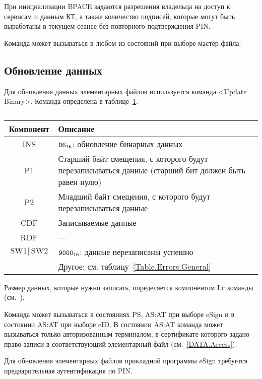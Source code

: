 При инициализации BPACE задаются разрешения 
владельца на доступ к сервисам и данным  
КТ, а также количество подписей, которые могут быть выработаны 
в текущем сеансе без повторного подтверждения PIN.

Команда может вызываться в любом из состояний при выборе мастер-файла.

\subsection{Обновление данных}
\label{Oper.Descr.Update}

Для обновления данных элементарных файлов используется команда <Update Binary>.
Команда определена в таблице~\ref{Table.Oper.UpdateCmd}.

\begin{table}[hbt]
\caption{}\label{Table.Oper.UpdateCmd}
\begin{tabular}{|c|p{14cm}|}
\hline
Компонент & Описание\\
\hline
\hline
INS & $\texttt{D6}_{16}$: обновление бинарных данных\\
\hline
P1 & Старший байт смещения, с которого будут перезаписываться данные 
(старший бит должен быть равен нулю) \\
\hline
P2 & Младший байт смещения, с которого будут перезаписываться данные \\
\hline
CDF & Записываемые данные \\
\hline 
RDF &  --- \\
\hline
$\text{SW1} \parallel \text{SW2}$ & 
$\texttt{9000}_{16}$: данные перезаписаны успешно \\
\cline{2-2}
 & Другое: см. таблицу~\ref{Table.Errors.General} \\
\hline
\end{tabular}
\end{table}

Размер данных, которые нужно записать, определяется компонентом Lс команды 
(см.~\cite{APDU}).

Команда может вызываться в состояниях PS, AS:AT 
при выборе eSign и в состоянии AS:AT при выборе eID.
В состоянии AS:AT команда может вызываться только 
авторизованным терминалом, в сертификате которого
задано право записи в соответствующий элементарный 
файл (см.~\ref{DATA.Access}).

Для обновления элементарных файлов прикладной программы eSign 
требуется предварительная аутентификация по PIN.

